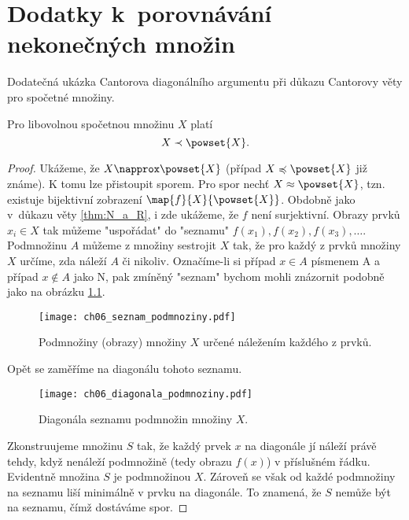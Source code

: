 \chapter{Dodatky k~porovnávání nekonečných množin}\label{chap:dodatky_k_porovnavani_nekonecnych_mn}
Dodatečná ukázka Cantorova diagonálního argumentu při důkazu Cantorovy věty pro spočetné množiny.
\begin{theorem}\label{thm:cantorova_veta_spocetne}
    Pro libovolnou spočetnou množinu $X$ platí
    \begin{equation*}
        X\prec\powset{X}.
    \end{equation*}
\end{theorem}
\begin{proof}
    Ukážeme, že $X\napprox\powset{X}$ (případ $X\preccurlyeq\powset{X}$ již známe). K tomu lze přistoupit sporem. Pro spor nechť $X\approx\powset{X}$, tzn. existuje bijektivní zobrazení $\map{f}{X}{\powset{X}}$. Obdobně jako v~důkazu věty \ref{thm:N_a_R}, i zde ukážeme, že $f$ není surjektivní. Obrazy prvků $x_i\in X$ tak můžeme "uspořádat" do "seznamu" $f(x_1),f(x_2),f(x_3),\dots$. Podmnožinu $A$ můžeme z množiny sestrojit $X$ tak, že pro každý z prvků množiny $X$ určíme, zda náleží $A$ či nikoliv. Označíme-li si případ $x\in A$ písmenem A a případ $x\notin A$ jako N, pak zmíněný "seznam" bychom mohli znázornit podobně jako na obrázku \ref{fig:seznam_podmnoziny}.
    \begin{figure}[H]
        \centering
        \texttt{[image: ch06\_seznam\_podmnoziny.pdf]}
        \caption{Podmnožiny (obrazy) množiny $X$ určené náležením každého z prvků.}
        \label{fig:seznam_podmnoziny}
    \end{figure}
    Opět se zaměříme na diagonálu tohoto seznamu.
    \begin{figure}[H]
        \centering
        \texttt{[image: ch06\_diagonala\_podmnoziny.pdf]}
        \caption{Diagonála seznamu podmnožin množiny $X$.}
        \label{fig:diagonala_podmnoziny}
    \end{figure}
    Zkonstruujeme množinu $S$ tak, že každý prvek $x$ na diagonále jí náleží právě tehdy, když nenáleží podmnožině (tedy obrazu $f(x)$) v příslušném řádku. Evidentně množina $S$ je podmnožinou $X$. Zároveň se však od každé podmnožiny na seznamu liší minimálně v prvku na diagonále. To znamená, že $S$ nemůže být na seznamu, čímž dostáváme spor.
\end{proof}

